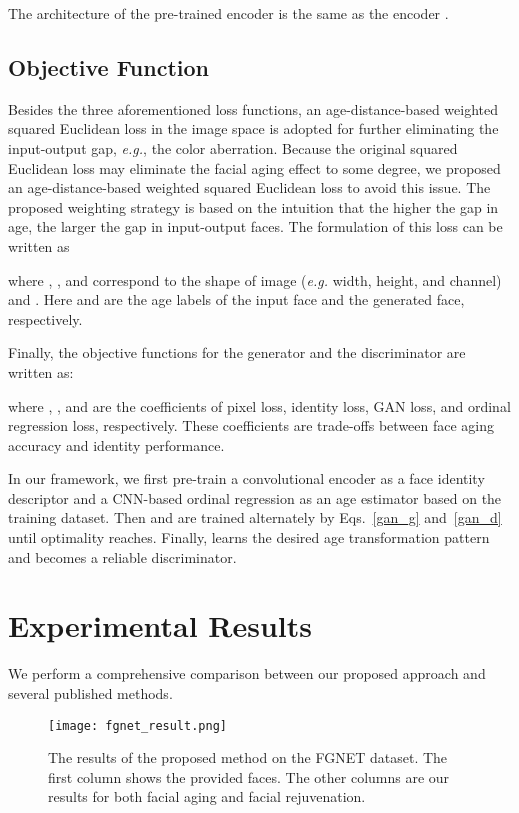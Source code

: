 \documentclass{article}
\begin{document}
The architecture of the pre-trained encoder is the same as the encoder .

\subsection{Objective Function}\label{objective}
Besides the three aforementioned loss functions, an age-distance-based weighted squared Euclidean loss in the image space is adopted for further eliminating the input-output gap, {\it e.g.}, the color aberration. Because the original squared Euclidean loss may eliminate the facial aging effect to some degree, we proposed an age-distance-based weighted squared Euclidean loss to avoid this issue. The proposed weighting strategy is based on the intuition that the higher the gap in age, the larger the gap in input-output faces. The formulation of this loss can be written as

where , , and  correspond to the shape of image  ({\it e.g.} width, height, and channel) and . Here  and  are the age labels of the input face and the generated face, respectively.

Finally, the objective functions for the generator  and the discriminator  are written as:

where , ,  and  are the coefficients of pixel loss, identity loss, GAN loss, and ordinal regression loss, respectively. These coefficients are trade-offs between face aging accuracy and identity performance.

In our framework, we first pre-train a convolutional encoder  as a face identity descriptor and a CNN-based ordinal regression  as an age estimator based on the training dataset. Then  and  are trained alternately by Eqs.~\eqref{gan_g} and~\eqref{gan_d} until optimality reaches. Finally,  learns the desired age transformation pattern and  becomes a reliable discriminator.

\section{Experimental Results}\label{exp}
We perform a comprehensive comparison between our proposed approach and several published methods.
\begin{figure*}[!ht]
\centering
\texttt{[image: fgnet\_result.png]}
\caption{The results of the proposed method on the FGNET dataset. The first column shows the provided faces. The other columns are our results for both facial aging and facial rejuvenation.}
\label{fgnet_result}
\end{figure*}
\end{document}
